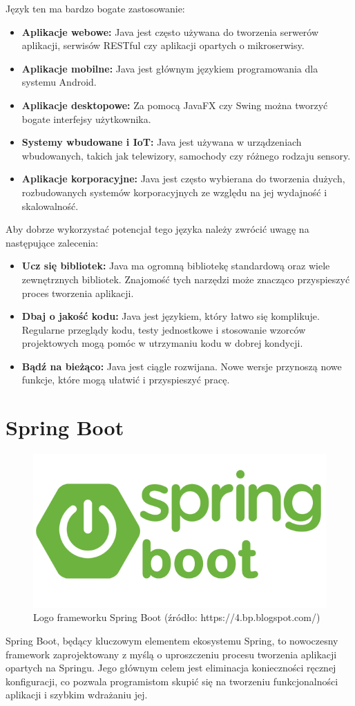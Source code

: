 Język ten ma bardzo bogate zastosowanie:
\begin{itemize}
\item \textbf{Aplikacje webowe:} Java jest często używana do tworzenia serwerów aplikacji, serwisów RESTful czy aplikacji opartych o mikroserwisy.
\item \textbf{Aplikacje mobilne:} Java jest głównym językiem programowania dla systemu Android.
\item \textbf{Aplikacje desktopowe:} Za pomocą JavaFX czy Swing można tworzyć bogate interfejsy użytkownika.
\item \textbf{Systemy wbudowane i IoT:} Java jest używana w urządzeniach wbudowanych, takich jak telewizory, samochody czy różnego rodzaju sensory.
\item \textbf{Aplikacje korporacyjne:} Java jest często wybierana do tworzenia dużych, rozbudowanych systemów korporacyjnych ze względu na jej wydajność i skalowalność.
\end{itemize}

Aby dobrze wykorzystać potencjał tego języka należy zwrócić uwagę na następujące zalecenia:
\begin{itemize}
\item \textbf{Ucz się bibliotek:} Java ma ogromną bibliotekę standardową oraz wiele zewnętrznych bibliotek. Znajomość tych narzędzi może znacząco przyspieszyć proces tworzenia aplikacji.
\item \textbf{Dbaj o jakość kodu:} Java jest językiem, który łatwo się komplikuje. Regularne przeglądy kodu, testy jednostkowe i stosowanie wzorców projektowych mogą pomóc w utrzymaniu kodu w dobrej kondycji.
\item \textbf{Bądź na bieżąco:} Java jest ciągle rozwijana. Nowe wersje przynoszą nowe funkcje, które mogą ułatwić i przyspieszyć pracę\cite{javaSpecification}.
\end{itemize}

\section{Spring Boot}
\begin{figure}[h]
    \centering
    \includegraphics[width=0.6\linewidth]{./img/springboot.png}
    \caption{Logo frameworku Spring Boot (źródło: https://4.bp.blogspot.com/)}
    \label{fig:Springboot}
\end{figure}
Spring Boot, będący kluczowym elementem ekosystemu Spring, to nowoczesny framework zaprojektowany z myślą o uproszczeniu procesu tworzenia aplikacji opartych na Springu. Jego głównym celem jest eliminacja konieczności ręcznej konfiguracji, co pozwala programistom skupić się na tworzeniu funkcjonalności aplikacji i szybkim wdrażaniu jej.


